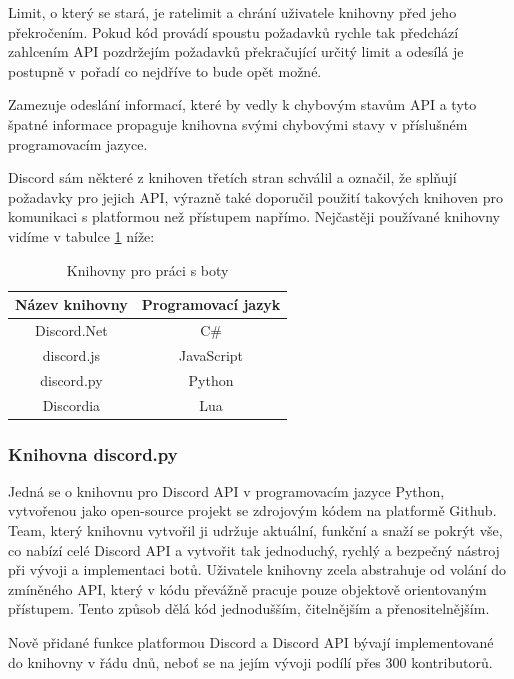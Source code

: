 \documentclass[
  program=inf,
biblatex=false,
sourcecodes=true,
joinlists=true,
  figures=true,
  tables=true,
  glossaries=true,
  index=false
]{kidiplom}
\begin{document}
Limit, o který se stará, je ratelimit \cite{rate} a chrání uživatele knihovny před jeho překročením. Pokud
kód provádí spoustu požadavků rychle tak předchází zahlcením API pozdržejím požadavků překračující
určitý limit a odesílá je postupně v pořadí co nejdříve to bude opět možné.

Zamezuje odeslání informací, které by vedly k chybovým stavům API a tyto špatné informace
propaguje knihovna svými chybovými stavy v příslušném programovacím jazyce.

Discord sám některé z knihoven třetích stran \cite{libs} schválil a označil, že splňují požadavky pro jejich API, výrazně
také doporučil použití takových knihoven pro komunikaci s platformou než přístupem napřímo.
Nejčastěji používané knihovny vidíme v tabulce \ref{libs} níže:

\begin{table}[h]
  \begin{center}
    \begin{tabular}{|c|c|}
      \hline
      Název knihovny & Programovací jazyk \\
      \hline
      Discord.Net & {C\#} \\
      discord.js & JavaScript \\
      discord.py & Python \\
      Discordia & Lua \\
      \hline
    \end{tabular}
  \end{center}
  \caption{\label{libs}Knihovny pro práci s boty \cite{libs}}
\end{table}

\newpage
\subsubsection{Knihovna discord.py}
Jedná se o knihovnu pro Discord API v programovacím jazyce Python, vytvořenou jako
open-source projekt se zdrojovým kódem na platformě Github. \cite{discordpy} Team, který knihovnu 
vytvořil ji udržuje aktuální, funkční a snaží se pokrýt vše, co nabízí celé Discord API
a vytvořit tak jednoduchý, rychlý a bezpečný nástroj při vývoji a implementaci botů. 
Uživatele knihovny zcela abstrahuje od volání do zmíněného API, který v kódu převážně pracuje pouze objektově
orientovaným přístupem. Tento způsob dělá kód jednodušším, čitelnějším a přenositelnějším.

Nově přidané funkce platformou Discord a Discord API bývají implementované do knihovny
v řádu dnů, neboť se na jejím vývoji podílí přes 300 kontributorů.
\end{document}

